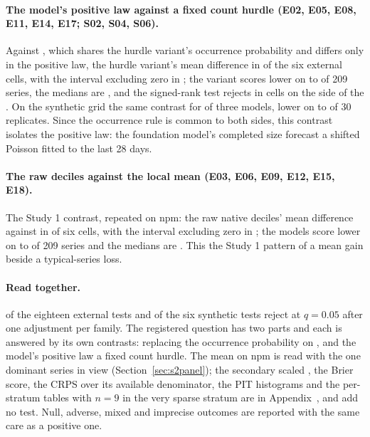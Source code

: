 \paragraph{The model's positive law against a fixed count hurdle (E02, E05, E08, E11, E14, E17; S02, S04,
S06).} Against \hc{}, which shares the hurdle variant's occurrence probability and differs only in the
positive law, the hurdle variant's mean difference  in
\tbd{} of the six external cells, with the interval excluding zero in \tbd{}; the variant scores lower on
\tbd{} to \tbd{} of 209 series, the medians are , and the signed-rank test rejects
in \tbd{} cells on the side of the . On the synthetic grid the same contrast
 for \tbd{} of three models, lower on \tbd{} to \tbd{}
of 30 replicates. Since the occurrence rule is common to both sides, this contrast isolates the positive
law: the foundation model's completed size forecast  a shifted
Poisson fitted to the last 28 days.

\paragraph{The raw deciles against the local mean (E03, E06, E09, E12, E15, E18).} The Study 1 contrast,
repeated on npm: the raw native deciles' mean difference against \lm{}  in \tbd{} of six cells, with the interval excluding zero in \tbd{}; the models score lower on
\tbd{} to \tbd{} of 209 series and the medians are . This  the Study 1 pattern of a mean gain beside a typical-series loss.

\paragraph{Read together.} \tbd{} of the eighteen external tests and \tbd{} of the six synthetic tests reject
at $q = 0.05$ after one adjustment per family. The registered question has two parts and each is answered
by its own contrasts: replacing the occurrence probability  on \qs{}, and
the model's positive law  a fixed count hurdle. The mean on npm is read with the
one dominant series in view (Section~\ref{sec:s2panel}); the secondary scaled \qs{}, the Brier score, the
CRPS over its available denominator, the PIT histograms and the per-stratum tables with $n = 9$ in the very
sparse stratum are in Appendix~\tbd{}, and add no test. Null, adverse, mixed and imprecise outcomes are
reported with the same care as a positive one.
